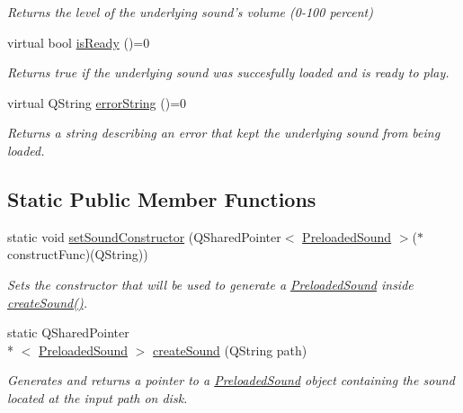 \begin{DoxyCompactItemize}
\begin{DoxyCompactList}\small\item\em Returns the level of the underlying sound's volume (0-\/100 percent) \end{DoxyCompactList}\item 
\hypertarget{class_picto_1_1_preloaded_sound_a952c9eb2edc3f79c36a84569cc232042}{virtual bool \hyperlink{class_picto_1_1_preloaded_sound_a952c9eb2edc3f79c36a84569cc232042}{is\-Ready} ()=0}\label{class_picto_1_1_preloaded_sound_a952c9eb2edc3f79c36a84569cc232042}

\begin{DoxyCompactList}\small\item\em Returns true if the underlying sound was succesfully loaded and is ready to play. \end{DoxyCompactList}\item 
virtual Q\-String \hyperlink{class_picto_1_1_preloaded_sound_a4681726539ed0e4f493860d487ef3f59}{error\-String} ()=0
\begin{DoxyCompactList}\small\item\em Returns a string describing an error that kept the underlying sound from being loaded. \end{DoxyCompactList}\end{DoxyCompactItemize}
\subsection*{Static Public Member Functions}
\begin{DoxyCompactItemize}
\item 
static void \hyperlink{class_picto_1_1_preloaded_sound_a52385d8c6fb8563fb8c82455f9677acc}{set\-Sound\-Constructor} (Q\-Shared\-Pointer$<$ \hyperlink{class_picto_1_1_preloaded_sound}{Preloaded\-Sound} $>$($\ast$construct\-Func)(Q\-String))
\begin{DoxyCompactList}\small\item\em Sets the constructor that will be used to generate a \hyperlink{class_picto_1_1_preloaded_sound}{Preloaded\-Sound} inside \hyperlink{class_picto_1_1_preloaded_sound_ae242a5728bce44d1ac6bfcac2b958f81}{create\-Sound()}. \end{DoxyCompactList}\item 
static Q\-Shared\-Pointer\\*
$<$ \hyperlink{class_picto_1_1_preloaded_sound}{Preloaded\-Sound} $>$ \hyperlink{class_picto_1_1_preloaded_sound_ae242a5728bce44d1ac6bfcac2b958f81}{create\-Sound} (Q\-String path)
\begin{DoxyCompactList}\small\item\em Generates and returns a pointer to a \hyperlink{class_picto_1_1_preloaded_sound}{Preloaded\-Sound} object containing the sound located at the input path on disk. \end{DoxyCompactList}\end{DoxyCompactItemize}


